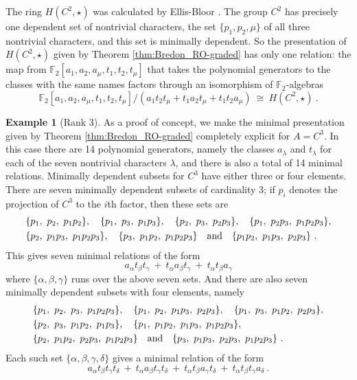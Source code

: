\documentclass{amsart}[12pt]
\newcommand{\mF}{{\mathbb F}}
\newcommand{\iso}{\cong}
\numberwithin{equation}{section}
\theoremstyle{definition}
\newtheorem{eg}[equation]{Example}
\begin{document}
The ring $H(C^2,\star)$ was calculated by
Ellis-Bloor \cite[Theorem 4.14]{ellis-bloor}.
The group $C^2$ has precisely one dependent set of nontrivial characters,
the set $\{p_1,p_2,\mu\}$ of all three nontrivial characters,
and this set is  minimally dependent.
So the presentation of $H(C^2,\star)$ given by Theorem 
\ref{thm:Bredon_RO-graded} has only one relation:
the map from $\mF_2[a_1,a_2,a_\mu,t_1,t_2,t_\mu]$
that takes the polynomial generators to the classes with the same names
factors through an isomorphism of $\mF_2$-algebras
\[ \mF_2[a_1,a_2,a_\mu,t_1,t_2,t_\mu] / (a_1 t_2 t_\mu + t_1 a_2 t_\mu + t_1 t_2 a_\mu) \ \iso \ H(C^2,\star)\ .\]

\begin{eg}[Rank 3]\label{eg:rank3}
  As a proof of concept, we make the minimal presentation
  given by Theorem \ref{thm:Bredon_RO-graded} completely explicit for $A=C^3$.
  In this case there are 14 polynomial generators, namely the classes
  $a_\lambda$ and $t_\lambda$ for each of the seven nontrivial characters $\lambda$,
  and there is also a total of 14 minimal relations.
  Minimally dependent subsets for $C^3$ have either three or four elements.
  There are seven minimally dependent subsets of cardinality 3;
  if $p_i$ denotes the projection of $C^3$ to the $i$th factor, then these sets are
    \begin{align*}
    &\{ p_1,\ p_2,\ p_1 p_2\},\quad
    \{ p_1,\ p_3,\ p_1 p_3\}, \quad \{ p_2,\ p_3,\ p_2 p_3\},\quad \{ p_1,\ p_2 p_3,\ p_1 p_2 p_3\},\\
    &    \{ p_2,\ p_1 p_3,\ p_1 p_2 p_3\},\quad
      \{ p_3,\ p_1 p_2,\ p_1 p_2 p_3\} \text{\quad and\quad}  \{ p_1 p_2,\ p_1 p_3,\ p_2 p_3\} \ .
  \end{align*}
  This gives seven minimal relations of the form
  \[  a_{\alpha} t_{\beta} t_{\gamma}\ +\ t_{\alpha} a_{\beta} t_{\gamma}\ +\ t_{\alpha} t_{\beta} a_{\gamma}\]
  where  $\{\alpha,\beta,\gamma\}$ runs over the above seven sets.
  And there are also seven minimally dependent subsets with four elements, namely 
    \begin{align*}
    &\{ p_1,\ p_2,\ p_3,\ p_1 p_2 p_3\},\quad
    \{ p_1,\ p_2,\ p_1 p_3,\ p_2 p_3\},\quad
    \{ p_1,\ p_3,\ p_1 p_2,\ p_2 p_3\},\\
    & \{ p_2,\ p_3,\ p_1 p_2,\ p_1 p_3\},\quad
      \{ p_1,\ p_1 p_2,\ p_1 p_3,\ p_1 p_2 p_3\},\\
   &\{ p_2,\ p_1 p_2,\ p_2 p_3,\ p_1 p_2 p_3\}\text{\quad and\quad}
    \{ p_3,\ p_1 p_3,\ p_2 p_3,\ p_1 p_2 p_3\}\ .
  \end{align*}
  Each such set $\{\alpha,\beta,\gamma,\delta\}$ gives a minimal relation of the form
  \[  a_{\alpha} t_{\beta} t_{\gamma} t_\delta\ +\ t_{\alpha} a_{\beta} t_{\gamma} t_\delta \ +\ t_{\alpha} t_{\beta} a_{\gamma}t_\delta\  +\ t_{\alpha} t_{\beta} t_{\gamma}a_\delta \ .\]
\end{eg}
\end{document}
